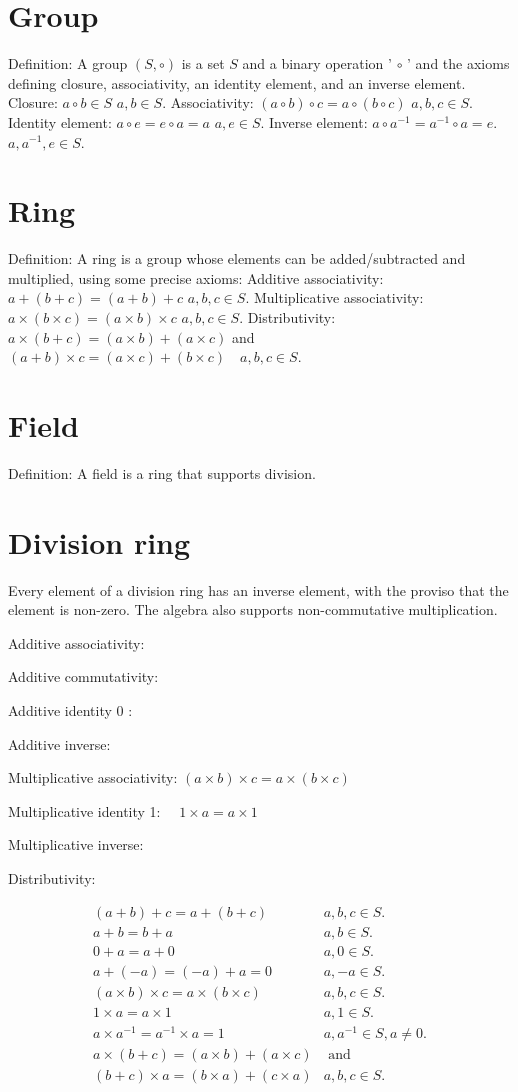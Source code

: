 \section{Group}
Definition: A group $(S, \circ)$ is a set $S$ and a binary operation ' $\circ$ ' and the axioms defining closure, associativity, an identity element, and an inverse element.
Closure:
$a \circ b \in S$
$a, b \in S$.
Associativity:
$(a \circ b) \circ c=a \circ(b \circ c)$
$a, b, c \in S$.
Identity element:
$a \circ e=e \circ a=a$
$a, e \in S$.
Inverse element:
$a \circ a^{-1}=a^{-1} \circ a=e$.
$a, a^{-1}, e \in S$.

\section{Ring}
Definition: A ring is a group whose elements can be added/subtracted and multiplied, using some precise axioms:
Additive associativity:
$a+(b+c)=(a+b)+c$
$a, b, c \in S$.
Multiplicative associativity: $a \times(b \times c)=(a \times b) \times c$
$a, b, c \in S$.
Distributivity:
$a \times(b+c)=(a \times b)+(a \times c)$ and
$(a+b) \times c=(a \times c)+(b \times c) \quad a, b, c \in S$.

\section{Field}
Definition: A field is a ring that supports division.

\section{Division ring}
Every element of a division ring has an inverse element, with the proviso that the element is non-zero. The algebra also supports non-commutative multiplication.

Additive associativity:

Additive commutativity:

Additive identity 0 :

Additive inverse:

Multiplicative associativity: $(a \times b) \times c=a \times(b \times c)$

Multiplicative identity 1: $\quad 1 \times a=a \times 1$

Multiplicative inverse:

Distributivity:

$$
\begin{array}{ll}
(a+b)+c=a+(b+c) & a, b, c \in S . \\
a+b=b+a & a, b \in S . \\
0+a=a+0 & a, 0 \in S . \\
a+(-a)=(-a)+a=0 & a,-a \in S . \\
(a \times b) \times c=a \times(b \times c) & a, b, c \in S . \\
1 \times a=a \times 1 & a, 1 \in S . \\
a \times a^{-1}=a^{-1} \times a=1 & a, a^{-1} \in S, a \neq 0 . \\
a \times(b+c)=(a \times b)+(a \times c) & \text { and } \\
(b+c) \times a=(b \times a)+(c \times a) & a, b, c \in S .
\end{array}
$$

